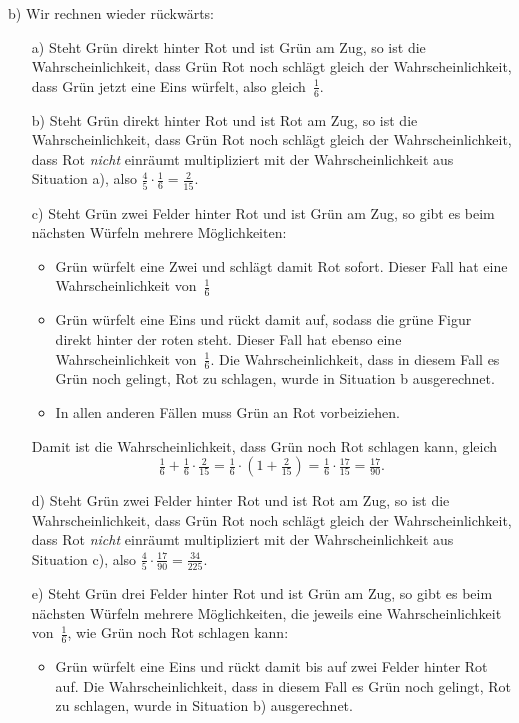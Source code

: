 \documentclass{article}
\begin{document}
b) Wir rechnen wieder rückwärts:

\begin{enumerate}
  \item[a)] Steht Grün direkt hinter Rot und ist Grün am Zug, so ist die Wahrscheinlichkeit, dass Grün Rot noch schlägt gleich der Wahrscheinlichkeit, dass Grün jetzt eine Eins würfelt, also gleich~$\tfrac{1}{6}$.
  \item[b)] Steht Grün direkt hinter Rot und ist Rot am Zug, so ist die Wahrscheinlichkeit, dass Grün Rot noch schlägt gleich der Wahrscheinlichkeit, dass Rot \emph{nicht} einräumt multipliziert mit der Wahrscheinlichkeit aus Situation a), also $\tfrac{4}{5} \cdot \tfrac{1}{6} = \tfrac{2}{15}$.
  \item[c)]
    Steht Grün zwei Felder hinter Rot und ist Grün am Zug, so gibt es beim nächsten Würfeln mehrere Möglichkeiten:
    \begin{itemize}
      \item Grün würfelt eine Zwei und schlägt damit Rot sofort. Dieser Fall hat eine Wahrscheinlichkeit von~$\tfrac{1}{6}$
      \item Grün würfelt eine Eins und rückt damit auf, sodass die grüne Figur direkt hinter der roten steht. Dieser Fall hat ebenso eine Wahrscheinlichkeit von~$\tfrac{1}{6}$. Die Wahrscheinlichkeit, dass in diesem Fall es Grün noch gelingt, Rot zu schlagen, wurde in Situation b ausgerechnet.
      \item In allen anderen Fällen muss Grün an Rot vorbeiziehen.
    \end{itemize}
    Damit ist die Wahrscheinlichkeit, dass Grün noch Rot schlagen kann, gleich
    \[ \tfrac{1}{6} + \tfrac{1}{6} \cdot \tfrac{2}{15} = \tfrac{1}{6} \cdot (1 + \tfrac{2}{15}) = \tfrac{1}{6} \cdot \tfrac{17}{15} = \tfrac{17}{90}. \]
  \item[d)] Steht Grün zwei Felder hinter Rot und ist Rot am Zug, so ist die Wahrscheinlichkeit, dass Grün Rot noch schlägt gleich der Wahrscheinlichkeit, dass Rot \emph{nicht} einräumt multipliziert mit der Wahrscheinlichkeit aus Situation c), also $\tfrac{4}{5} \cdot \tfrac{17}{90} = \tfrac{34}{225}$.
  \item[e)]
    Steht Grün drei Felder hinter Rot und ist Grün am Zug, so gibt es beim nächsten Würfeln mehrere Möglichkeiten, die jeweils eine Wahrscheinlichkeit von~$\tfrac{1}{6}$, wie Grün noch Rot schlagen kann:
    \begin{itemize}
      \item Grün würfelt eine Eins und rückt damit bis auf zwei Felder hinter Rot auf. Die Wahrscheinlichkeit, dass in diesem Fall es Grün noch gelingt, Rot zu schlagen, wurde in Situation b) ausgerechnet.

\end{itemize}
\end{enumerate}
\end{document}
